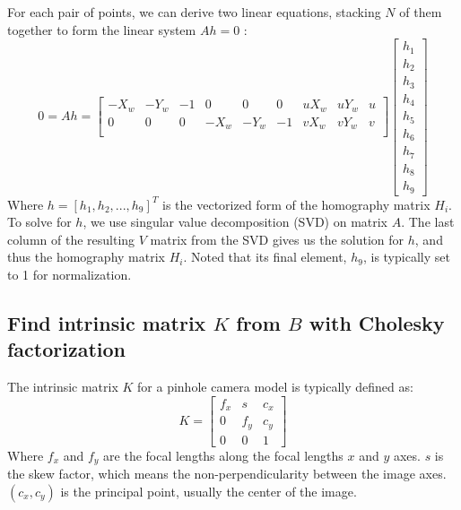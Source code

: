 \documentclass[12pt,letterpaper]{article}
\begin{document}
For each pair of points, we can derive two linear equations, stacking $N$ of them together to form the linear system $Ah = 0$ :
\begin{equation}
    0 = Ah = \begin{bmatrix}
        -X_w & -Y_w & -1 & 0    & 0    & 0  & uX_w & uY_w & u \\
        0    & 0    & 0  & -X_w & -Y_w & -1 & vX_w & vY_w & v \\
    \end{bmatrix}
    \begin{bmatrix}
        h_1 \\
        h_2 \\
        h_3 \\
        h_4 \\
        h_5 \\
        h_6 \\
        h_7 \\
        h_8 \\
        h_9
    \end{bmatrix}
\end{equation}
Where $h = [h_1, h_2, ..., h_9]^T$ is the vectorized form of the homography matrix $H_i$. To solve for $h$, we use singular value decomposition (SVD) on matrix $A$. The last column of the resulting $V$ matrix from the SVD gives us the solution for $h$, and thus the homography matrix $H_i$. Noted that its final element, $h_9$, is typically set to 1 for normalization.

\subsection{Find intrinsic matrix $K$ from $B$ with Cholesky factorization}
The intrinsic matrix $K$ for a pinhole camera model is typically defined as:
\begin{equation}
    K = \begin{bmatrix}
        f_x & s   & c_x \\
        0   & f_y & c_y \\
        0   & 0   & 1
    \end{bmatrix}
\end{equation}
Where $f_x$ and $f_y$ are the focal lengths along the focal lengths $x$ and $y$ axes. $s$ is the skew factor, which means the non-perpendicularity between the image axes. $(c_x, c_y)$ is the principal point, usually the center of the image.
\end{document}
